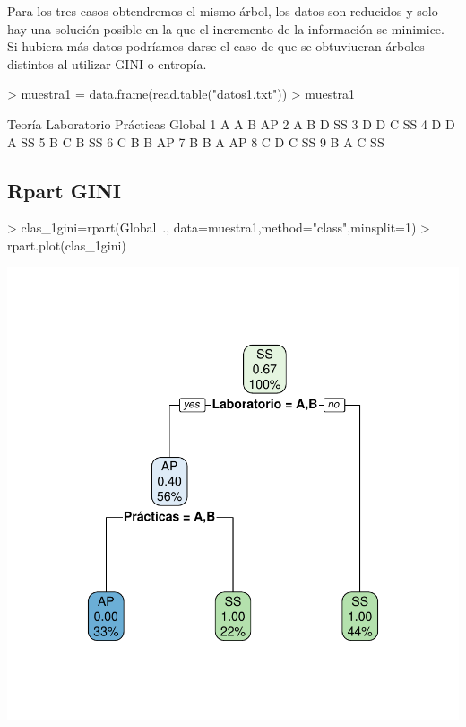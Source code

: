 \documentclass [a4paper] {article}
\begin{document}
Para los tres casos obtendremos el mismo árbol, los datos son reducidos y solo hay una solución posible en la que el incremento de la información se minimice.
Si hubiera más datos podríamos darse el caso de que se obtuviueran árboles distintos al utilizar GINI o entropía.
\begin{Schunk}
\begin{Sinput}
> muestra1 = data.frame(read.table("datos1.txt"))
> muestra1
\end{Sinput}
\begin{Soutput}
  Teoría Laboratorio Prácticas Global
1      A           A         B     AP
2      A           B         D     SS
3      D           D         C     SS
4      D           D         A     SS
5      B           C         B     SS
6      C           B         B     AP
7      B           B         A     AP
8      C           D         C     SS
9      B           A         C     SS
\end{Soutput}
\end{Schunk}

\newpage
\subsection{Rpart GINI}
\begin{center}
\begin{Schunk}
\begin{Sinput}
> clas_1gini=rpart(Global~., data=muestra1,method="class",minsplit=1)
> rpart.plot(clas_1gini)
\end{Sinput}
\end{Schunk}
\includegraphics{entrega-rpart1_gini}
\end{center}
\end{document}
